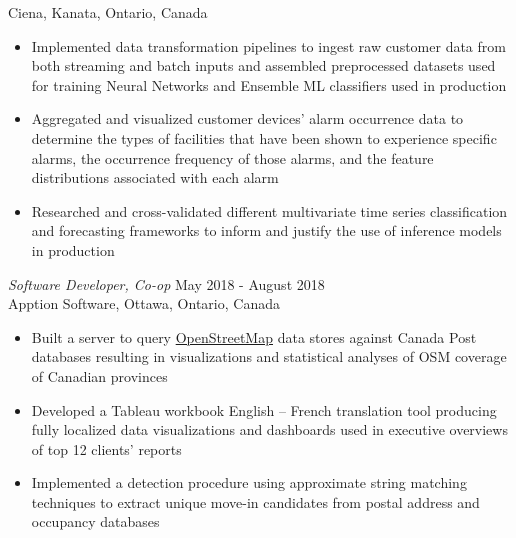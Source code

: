 \documentclass[margin]{res}
\begin{document}
\begin{resume}
Ciena, Kanata, Ontario, Canada
\begin{itemize}  \itemsep -2pt %
\item Implemented data transformation pipelines to ingest raw
      customer data from both streaming and batch inputs and 
      assembled preprocessed datasets used for training Neural Networks
      and Ensemble ML classifiers used in production
\item Aggregated and visualized customer devices' alarm occurrence data
      to determine the types
      of facilities that have been shown to experience specific alarms,
      the occurrence frequency of those alarms, and the feature distributions associated with each alarm
\item Researched and cross-validated different multivariate time series classification and forecasting frameworks to inform and justify the use of inference models in production
\end{itemize}
\clearpage
{\sl Software Developer, Co-op} \hfill            May 2018 - August 2018\\
Apption Software, Ottawa, Ontario, Canada
\begin{itemize}  \itemsep -2pt %
\item Built a server to query \href{https://www.openstreetmap.org/}{OpenStreetMap} data stores
      against Canada Post databases resulting in visualizations and statistical analyses of OSM
      coverage of Canadian provinces
\item Developed a Tableau workbook English – French translation tool producing fully
      localized data visualizations and dashboards used in executive overviews of top 12
      clients’ reports 
\item Implemented a detection procedure using approximate string matching techniques to extract
      unique move-in candidates from postal address and occupancy databases 
\end{itemize}



\end{resume}
\end{document}
